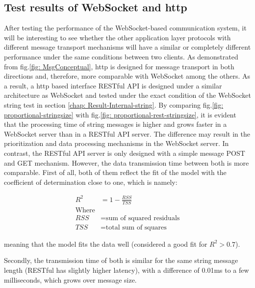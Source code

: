 \subsection{Test results of WebSocket and \gls{http}} \label{chap: Result-RestFUL_WS}
After testing the performance of the WebSocket-based communication system, it will be 
interesting to see whether the other application layer protocols with different message 
transport mechanisms will have a similar or completely different performance under the 
same conditions between two clients. As demonstrated from fig.\ref{fig: MsgConceptual}, \gls{http} is designed 
for message transport in both directions and, therefore, more comparable with WebSocket 
among the others. As a result, a \gls{http} based interface RESTful API is designed under 
a similar architecture as WebSocket and tested under the exact condition of the WebSocket 
string test in section \ref{chap: Result-Internal-string}. By comparing 
fig.\ref{fig: proportional-stringsize} with fig.\ref{fig: proportional-rest-stringsize}, 
it is evident that the processing time of string messages is higher and grows faster in 
a WebSocket server than in a RESTful API server. The difference may result in the 
prioritization and data processing mechanisms in the WebSocket server. In contrast, 
the RESTful API server is only designed with a simple message POST and GET mechanism. 
However, the data transmission time between both is more comparable. First of all, 
both of them reflect the fit of the model with the coefficient of determination close 
to one, which is namely\cite{archdeacon1994correlation}: 


    \begin{align}
        R^{2} &= 1-\frac{RSS}{TSS}\\
        \text{Where} \nonumber\\
        RSS & = \text{sum of squared residuals} \nonumber\\
        TSS & = \text{total sum of squares}\nonumber
    \end{align}

meaning that the model fits the data well (considered a good fit for $R^{2}>0.7$).





Secondly, the transmission time of both is similar 
for the same string message length (RESTful has slightly higher latency), with a difference 
of 0.01ms to a few milliseconds, which grows over message size. 



